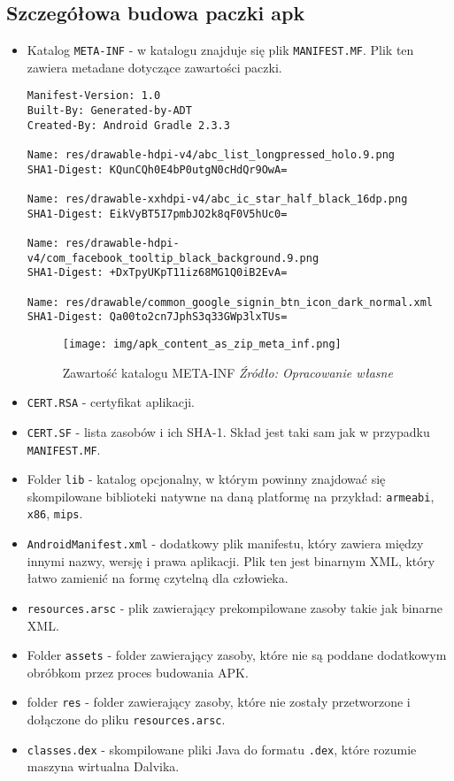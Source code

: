 \documentclass[12pt,a4paper,leqno,oneside,titlepage]{book}
\begin{document}
\subsection{Szczegółowa budowa paczki apk}
\begin{itemize}
%
\item Katalog \verb|META-INF|\cite{JarSigning} - w katalogu znajduje się plik \verb|MANIFEST.MF|. Plik ten zawiera metadane dotyczące zawartości paczki.
%
\begin{lstlisting}[captionpos=b, caption={Zawartość pliku MANIFEST.MF}]
Manifest-Version: 1.0
Built-By: Generated-by-ADT
Created-By: Android Gradle 2.3.3

Name: res/drawable-hdpi-v4/abc_list_longpressed_holo.9.png
SHA1-Digest: KQunCQh0E4bP0utgN0cHdQr9OwA=

Name: res/drawable-xxhdpi-v4/abc_ic_star_half_black_16dp.png
SHA1-Digest: EikVyBT5I7pmbJO2k8qF0V5hUc0=

Name: res/drawable-hdpi-v4/com_facebook_tooltip_black_background.9.png
SHA1-Digest: +DxTpyUKpT11iz68MG1Q0iB2EvA=

Name: res/drawable/common_google_signin_btn_icon_dark_normal.xml
SHA1-Digest: Qa00to2cn7JphS3q33GWp3lxTUs=
\end{lstlisting}
%
\begin{figure}[H]
	\centering
	\texttt{[image: img/apk\_content\_as\_zip\_meta\_inf.png]}
	\caption{Zawartość katalogu META-INF \emph{Źródło: Opracowanie własne}}
\end{figure}
%
\item \verb|CERT.RSA| - certyfikat aplikacji.
\item \verb|CERT.SF| - lista zasobów i ich SHA-1. Skład jest taki sam jak w przypadku \verb|MANIFEST.MF|.
%
\item Folder \verb|lib| - katalog opcjonalny, w którym powinny znajdować się skompilowane biblioteki natywne na daną platformę na przykład: \verb|armeabi|, \verb|x86|, \verb|mips|.
%
\item \verb|AndroidManifest.xml| - dodatkowy plik manifestu, który zawiera między innymi nazwy, wersję i prawa aplikacji. Plik ten jest binarnym XML, który łatwo zamienić na formę czytelną dla człowieka.
%
\item \verb|resources.arsc| - plik zawierający prekompilowane zasoby takie jak binarne XML.
%
\item Folder \verb|assets| - folder zawierający zasoby, które nie są poddane dodatkowym obróbkom przez proces budowania APK.
%
\item folder \verb|res| - folder zawierający zasoby, które nie zostały przetworzone i dołączone do pliku \verb|resources.arsc|.
%
\item \verb|classes.dex| - skompilowane pliki Java do formatu \verb|.dex|, które rozumie maszyna wirtualna Dalvika.
%
\end{itemize}
%
%
%
\end{document}
